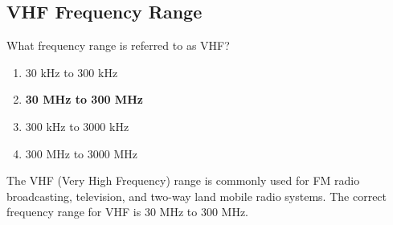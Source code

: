 \subsection{VHF Frequency Range}
\label{T3B08}

\begin{tcolorbox}[colback=gray!10!white,colframe=black!75!black,title=T3B08]
What frequency range is referred to as VHF?
\begin{enumerate}[noitemsep]
    \item 30 kHz to 300 kHz
    \item \textbf{30 MHz to 300 MHz}
    \item 300 kHz to 3000 kHz
    \item 300 MHz to 3000 MHz
\end{enumerate}
\end{tcolorbox}

The VHF (Very High Frequency) range is commonly used for FM radio broadcasting, television, and two-way land mobile radio systems. The correct frequency range for VHF is 30 MHz to 300 MHz.